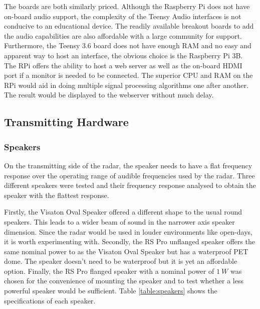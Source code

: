 The boards are both similarly priced. Although the Raspberry Pi does not have on-board audio support, the complexity of the Teensy Audio interfaces is not conducive to an educational device. The readily available breakout boards to add the audio capabilities are also affordable with a large community for support. Furthermore, the Teensy 3.6 board does not have enough RAM and no easy and apparent way to host an interface, the obvious choice is the Raspberry Pi 3B. The RPi offers the ability to host a web server as well as the on-board HDMI port if a monitor is needed to be connected. The superior CPU and RAM on the RPi would aid in doing multiple signal processing algorithms one after another. The result would be displayed to the webserver without much delay. 

\subsection{Transmitting Hardware}
\subsubsection{Speakers}
On the transmitting side of the radar, the speaker needs to have a flat frequency response over the operating range of audible frequencies used by the radar. Three different speakers were tested and their frequency response analysed to obtain the speaker with the flattest response.

Firstly, the Visaton Oval Speaker offered a different shape to the usual round speakers. This leads to a wider beam of sound in the narrower axis speaker dimension. Since the radar would be used in louder environments like open-days, it is worth experimenting with. Secondly, the RS Pro unflanged speaker offers the same nominal power to as the Visaton Oval Speaker but has a waterproof PET dome. The speaker doesn't need to be waterproof but it is yet an affordable option. Finally, the RS Pro flanged speaker with a nominal power of $1\ W$ was chosen for the convenience of mounting the speaker and to test whether a less powerful speaker would be sufficient. Table \ref{table:speakers} shows the specifications of each speaker.

